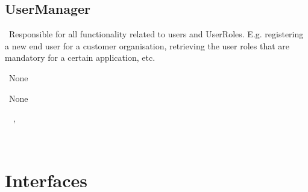 \subsection{UserManager}\label{comp:OnlineServiceOnlineServiceUserManager}
	\begin{description}
		\item[Responsibility:]~Responsible for all functionality related to users and UserRoles. E.g. registering a new end user for a customer organisation, retrieving the user roles that are mandatory for a certain application, etc.
		\item[Super-components:]~None
		\item[Sub-components:]~None
		\item[Provided interfaces:]~\iconprovided{}~, \iconprovided{}~
		\item[Required interfaces:]~\iconrequired{}~		
	\end{description}


\section{Interfaces} \label{sec:interfaces}

